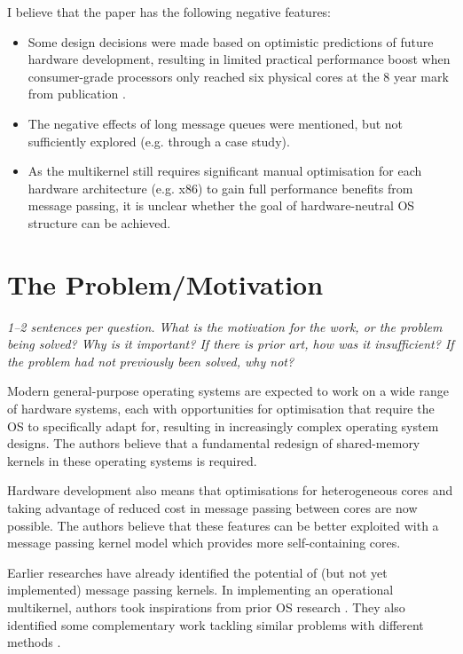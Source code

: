 \documentclass[11pt]{article}
\begin{document}
I believe that the paper has the following negative features:
\begin{itemize}
	\item Some design decisions were made based on optimistic predictions of future hardware development, resulting in limited practical performance boost when consumer-grade processors only reached six physical cores at the 8 year mark from publication \cite{8700k}.
	\item The negative effects of long message queues were mentioned, but not sufficiently explored (e.g. through a case study).
	\item As the multikernel still requires significant manual optimisation for each hardware architecture (e.g. x86) to gain full performance benefits from message passing, it is unclear whether the goal of hardware-neutral OS structure can be achieved. 
\end{itemize}

\section*{The Problem/Motivation}
\textsl{1--2 sentences per question. What is the motivation for the work, or the problem being solved? Why is it important? If there is prior art, how was it insufficient? If the problem had not previously been solved, why not?}

Modern general-purpose operating systems are expected to work on a wide range of hardware systems, each with opportunities for optimisation that require the OS to specifically adapt for, resulting in increasingly complex operating system designs. The authors believe that a fundamental redesign of shared-memory kernels in these operating systems is required.

Hardware development also means that optimisations for heterogeneous cores and taking advantage of reduced cost in message passing between cores are now possible. The authors believe that these features can be better exploited with a message passing kernel model which provides more self-containing cores.

Earlier researches \cite{chaves1993kernel, lauer1979duality} have already identified the potential of (but not yet implemented) message passing kernels. In implementing an operational multikernel, authors took inspirations from prior OS research \cite{liedtke1995micro, gamsa1999tornado, tanenbaum1985distributed}. They also identified some complementary work tackling similar problems with different methods \cite{shelepov2008scheduling, wentzlaff2009factored}.
\end{document}
